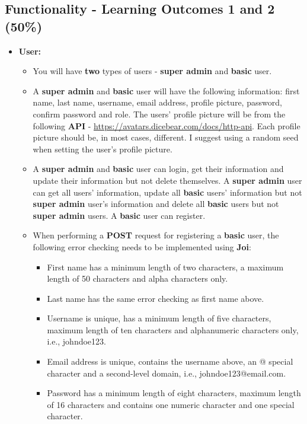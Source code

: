 \documentclass{article}
\begin{document}
\subsection*{Functionality - Learning Outcomes 1 and 2 (50\%)}
\begin{itemize}
	\item \textbf{User:}
	\begin{itemize}
		\item You will have \textbf{two} types of users - \textbf{super admin} and \textbf{basic} user.
		\item A \textbf{super admin} and \textbf{basic} user will have the following information: first name, last name, username, email address, profile picture, password, confirm password and role. The users' profile picture will be from the following \textbf{API} - \href{https://avatars.dicebear.com/docs/http-api}{https://avatars.dicebear.com/docs/http-api}. Each profile picture should be, in most cases, different. I suggest using a random seed when setting the user's profile picture.
		\item A \textbf{super admin} and \textbf{basic} user can login, get their information and update their information but not delete themselves. A \textbf{super admin} user can get all users' information, update all \textbf{basic} users' information but not \textbf{super admin} user's information and delete all \textbf{basic} users but not \textbf{super admin} users. A \textbf{basic} user can register.
		\item When performing a \textbf{POST} request for registering a \textbf{basic} user, the following error checking needs to be implemented using \textbf{Joi}:
		\begin{itemize}
			\item First name has a minimum length of two characters, a maximum length of 50 characters and alpha characters only.
			\item Last name has the same error checking as first name above.
			\item Username is unique, has a minimum length of five characters, maximum length of ten characters and alphanumeric characters only, i.e., johndoe123.
			\item Email address is unique, contains the username above, an @ special character and a second-level domain, i.e., johndoe123@email.com.
			\item Password has a minimum length of eight characters, maximum length of 16 characters and contains one numeric character and one special character.

\end{itemize}
\end{itemize}
\end{itemize}
\end{document}
